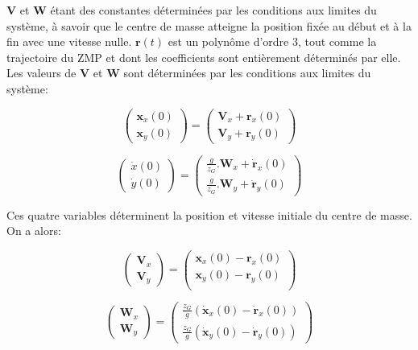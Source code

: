 $\mathbf{V}$ et $\mathbf{W}$ étant des constantes déterminées par les
conditions aux limites du système, à savoir que le centre de masse
atteigne la position fixée au début et à la fin avec une vitesse
nulle. $\textbf{r}(t)$ est un polynôme d'ordre 3, tout comme la
trajectoire du ZMP et dont les coefficients sont entièrement
déterminés par elle. Les valeurs de $\mathbf{V}$ et $\mathbf{W}$ sont
déterminées par les conditions aux limites du système:

\begin{equation}
  \left(
  \begin{array}{c}
    \mathbf{x}_x(0)\\
    \mathbf{x}_y(0)
  \end{array}
  \right) = \left(
  \begin{array}{c}
    \mathbf{V}_x + \mathbf{r}_x(0)\\
    \mathbf{V}_y + \mathbf{r}_y(0)
  \end{array}
  \right)
\end{equation}

\begin{equation}
  \left(
  \begin{array}{c}
    \dot{x}(0)\\
    \dot{y}(0)
  \end{array}
  \right) = \left(
  \begin{array}{c}
    \frac{g}{z_G} . \mathbf{W}_x + \dot{\mathbf{r}}_x(0)\\
    \frac{g}{z_G} . \mathbf{W}_y + \dot{\mathbf{r}}_y(0)
  \end{array}
  \right)
\end{equation}

Ces quatre variables déterminent la position et vitesse initiale du
centre de masse. On a alors:

\begin{equation}
  \left(
  \begin{array}{c}
    \mathbf{V}_x\\
    \mathbf{V}_y
  \end{array}
  \right) = \left(
  \begin{array}{c}
    \mathbf{x}_x(0) - \mathbf{r}_x(0)\\
    \mathbf{x}_y(0) - \mathbf{r}_y(0)\\
  \end{array}
  \right)
\end{equation}

\begin{equation}
  \left(
  \begin{array}{c}
    \mathbf{W}_x\\
    \mathbf{W}_y
  \end{array}
  \right) = \left(
  \begin{array}{c}
    \frac{z_G}{g}(\dot{\mathbf{x}}_x(0) - \dot{\mathbf{r}}_x(0))\\
    \frac{z_G}{g}(\dot{\mathbf{x}}_y(0) - \dot{\mathbf{r}}_y(0))
  \end{array}
  \right)
\end{equation}

